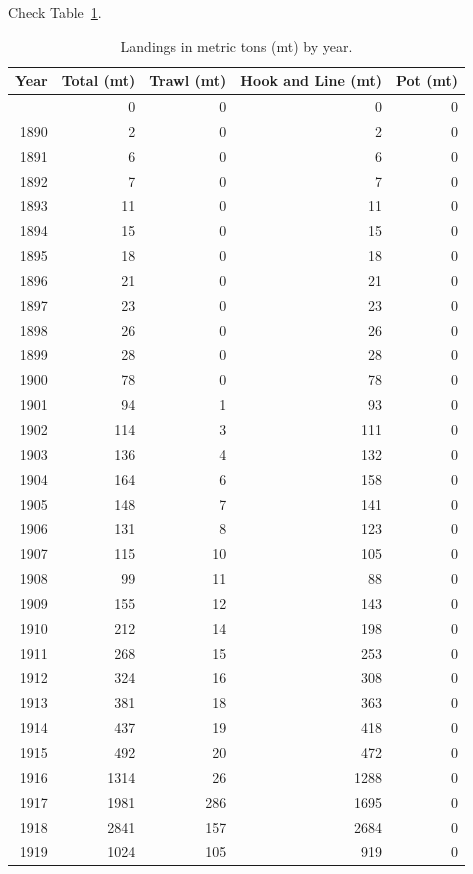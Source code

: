 \documentclass[
]{scrartcl}
\begin{document}
Check Table~\ref{tbl-landings}.

\begin{longtable}[]{@{}rrrrr@{}}

\caption{\label{tbl-landings}Landings in metric tons (mt) by year.}

\tabularnewline

\toprule\noalign{}
Year & Total (mt) & Trawl (mt) & Hook and Line (mt) & Pot (mt) \\
\midrule\noalign{}
\endhead
\bottomrule\noalign{}
\endlastfoot
1889 & 0 & 0 & 0 & 0 \\
1890 & 2 & 0 & 2 & 0 \\
1891 & 6 & 0 & 6 & 0 \\
1892 & 7 & 0 & 7 & 0 \\
1893 & 11 & 0 & 11 & 0 \\
1894 & 15 & 0 & 15 & 0 \\
1895 & 18 & 0 & 18 & 0 \\
1896 & 21 & 0 & 21 & 0 \\
1897 & 23 & 0 & 23 & 0 \\
1898 & 26 & 0 & 26 & 0 \\
1899 & 28 & 0 & 28 & 0 \\
1900 & 78 & 0 & 78 & 0 \\
1901 & 94 & 1 & 93 & 0 \\
1902 & 114 & 3 & 111 & 0 \\
1903 & 136 & 4 & 132 & 0 \\
1904 & 164 & 6 & 158 & 0 \\
1905 & 148 & 7 & 141 & 0 \\
1906 & 131 & 8 & 123 & 0 \\
1907 & 115 & 10 & 105 & 0 \\
1908 & 99 & 11 & 88 & 0 \\
1909 & 155 & 12 & 143 & 0 \\
1910 & 212 & 14 & 198 & 0 \\
1911 & 268 & 15 & 253 & 0 \\
1912 & 324 & 16 & 308 & 0 \\
1913 & 381 & 18 & 363 & 0 \\
1914 & 437 & 19 & 418 & 0 \\
1915 & 492 & 20 & 472 & 0 \\
1916 & 1314 & 26 & 1288 & 0 \\
1917 & 1981 & 286 & 1695 & 0 \\
1918 & 2841 & 157 & 2684 & 0 \\
1919 & 1024 & 105 & 919 & 0 \\

\end{longtable}
\end{document}
